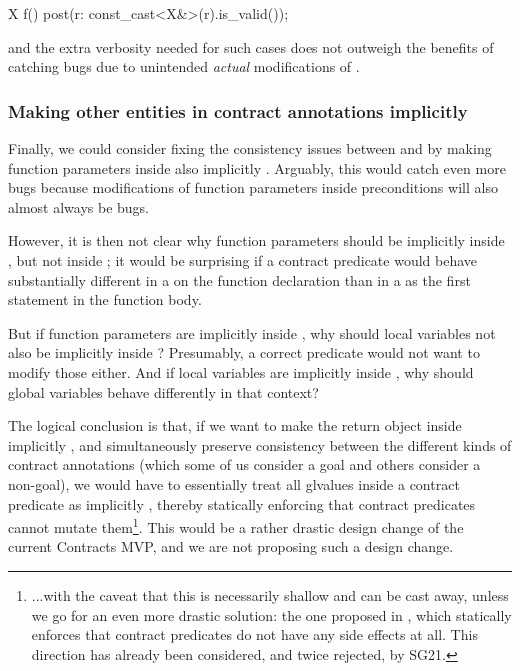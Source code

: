  \begin{codeblock}
X f()
  post(r: const_cast<X&>(r).is_valid());
\end{codeblock}

and the extra verbosity needed for such cases does not outweigh the benefits of catching bugs due to unintended \emph{actual} modifications of .

\subsubsection{Making other entities in contract annotations implicitly }

Finally, we could consider fixing the consistency issues between  and  by making function parameters inside  also implicitly . Arguably, this would catch even more bugs because modifications of function parameters inside preconditions will also almost always be bugs.

However, it is then not clear why function parameters should be implicitly  inside , but not inside ; it would be surprising if a contract predicate would behave substantially different in a  on the function declaration than in a  as the first statement in the function body.

But if function parameters are implicitly  inside , why should local variables not also be implicitly  inside ? Presumably, a correct predicate would not want to modify those either. And if local variables are implicitly  inside , why should global variables behave differently in that context?

The logical conclusion is that, if we want to make the return object inside  implicitly , and simultaneously preserve consistency between the different kinds of contract annotations (which some of us consider a goal and others consider a non-goal), we would have to essentially treat all glvalues inside a contract predicate as implicitly , thereby statically enforcing that contract predicates cannot mutate them\footnote{...with the caveat that this  is necessarily shallow and can be cast away, unless we go for an even more drastic solution: the one proposed in \cite{P2680R1}, which statically enforces that contract predicates do not have any side effects at all. This direction has already been considered, and twice rejected, by SG21.}. This would be a rather drastic design change of the current Contracts MVP, and we are not proposing such a design change.

